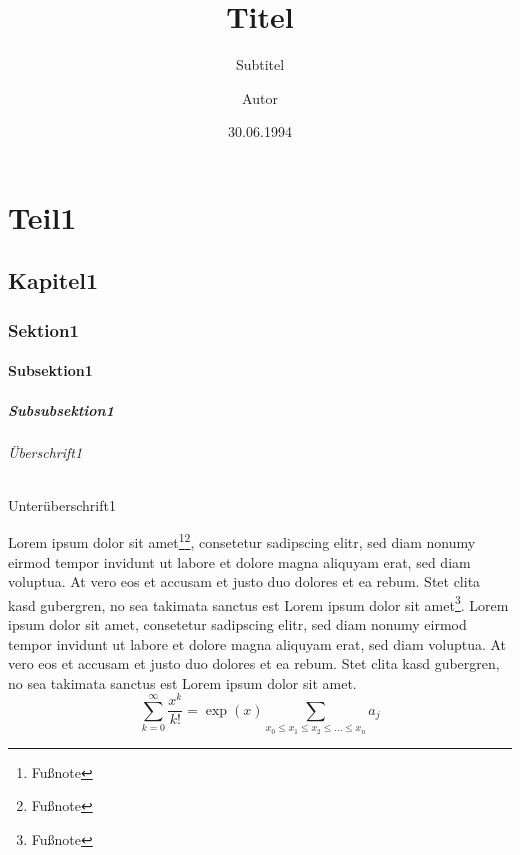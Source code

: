 \documentclass{scrreprt}	%
\begin{document}
\titlehead{Titelkopf}
\title{Titel}
\subject{Oberthema}
\subtitle{Subtitel}
\author{Autor}
\date{30.06.1994}
\publishers{Herausgeber}
\dedication{Widmung}
\maketitle

\tableofcontents

\part{Teil1}
\chapter{Kapitel1}
\section{Sektion1}
\subsection{Subsektion1}
\subsubsection{Subsubsektion1}
\paragraph{Überschrift1}
\subparagraph{Unterüberschrift1}
Lorem ipsum dolor sit amet\footnote{Fußnote}\footnote{Fußnote}, consetetur sadipscing elitr, sed diam nonumy eirmod tempor invidunt ut labore et dolore magna aliquyam erat, sed diam voluptua. At vero eos et accusam et justo duo dolores et ea rebum. Stet clita kasd gubergren, no sea takimata sanctus est Lorem ipsum dolor sit amet\footnote{Fußnote}. Lorem ipsum dolor sit amet, consetetur sadipscing elitr, sed diam nonumy eirmod tempor invidunt ut labore et dolore magna aliquyam erat, sed diam voluptua. At vero eos et accusam et justo duo dolores et ea rebum. Stet clita kasd gubergren, no sea takimata sanctus est Lorem ipsum dolor sit amet\cite{dummy}.
$$
 \sum_{k = 0}^{ \infty} \frac{x^{k}}{k!} = \exp(x)
\sum_{x_0 \le x_1 \le x_2 \le ... \le x_n} a_j
$$
\listoffigures
\listoftables

\end{document}
